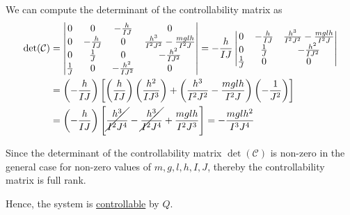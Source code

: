 We can compute the determinant of the controllability matrix as
\begin{align*}
    \text{det}(\mathcal{C})
     & =
    \begin{vmatrix}
        0           & 0             & -\frac{h}{IJ}     & 0                                         \\
        0           & -\frac{h}{IJ} & 0                 & \frac{h^3}{I^2 J^2}-\frac{m g l h}{I^2 J} \\
        0           & \frac{1}{J}   & 0                 & -\frac{h^2}{IJ^2}                         \\
        \frac{1}{J} & 0             & -\frac{h^2}{IJ^2} & 0
    \end{vmatrix}
    =
    -\frac{h}{IJ}
    \begin{vmatrix}
        0           & -\frac{h}{IJ} & \frac{h^3}{I^2 J^2}-\frac{m g l h}{I^2 J} \\
        0           & \frac{1}{J}   & -\frac{h^2}{IJ^2}                         \\
        \frac{1}{J} & 0             & 0
    \end{vmatrix}
    \\ & =
    \left( -\frac{h}{IJ} \right) \left[ \left( \frac{h}{IJ} \right) \left( \frac{h^2}{I J^3} \right) + \left( \frac{h^3}{I^2 J^2}-\frac{m g l h}{I^2 J} \right) \left( -\frac{1}{J^2} \right) \right]
    \\ & =
    \left( -\frac{h}{IJ} \right) \left[ \cancel{\frac{h^3}{I^2 J^4}} - \cancel{\frac{h^3}{I^2 J^4}} + \frac{m g l h}{I^2 J^3} \right]
    =
    -\frac{m g l h^2}{I^3 J^4}
\end{align*}

Since the determinant of the controllability matrix \( \det(\mathcal{C}) \) is non-zero in the general case for non-zero values of \( m, g, l, h, I, J \), thereby the controllability matrix is full rank.

Hence, the system is \underline{controllable} by \( Q \).
